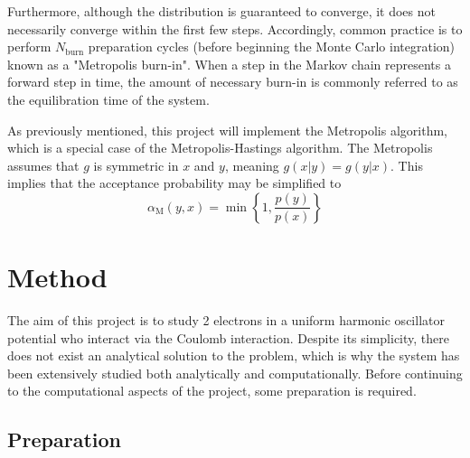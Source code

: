 \documentclass[nofootinbib,reprint,english]{revtex4-1}
\begin{document}
Furthermore, although the distribution is guaranteed to converge, it does not necessarily converge within the first few steps. Accordingly, common practice is to perform \(N_\text{burn}\) preparation cycles (before beginning the Monte Carlo integration) known as a "Metropolis burn-in". When a step in the Markov chain represents a forward step in time, the amount of necessary burn-in is commonly referred to as the equilibration time of the system.

As previously mentioned, this project will implement the Metropolis algorithm, which is a special case of the Metropolis-Hastings algorithm. The Metropolis assumes that \(g\) is symmetric in \(x\) and \(y\), meaning \(g(x|y)=g(y|x)\). This implies that the acceptance probability may be simplified to
\begin{equation}\label{eq:Metropolis_acceptance_probability}
\alpha_\text{M}(y,x)=\min\left\lbrace1,\frac{p(y)}{p(x)}\right\rbrace
\end{equation}

\section{Method}
The aim of this project is to study 2 electrons in a uniform harmonic oscillator potential who interact via the Coulomb interaction. Despite its simplicity, there does not exist an analytical solution to the problem, which is why the system has been extensively studied both analytically and computationally. Before continuing to the computational aspects of the project, some preparation is required.
\subsection{Preparation}
\end{document}
